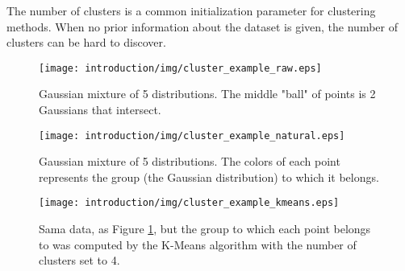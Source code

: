 The number of clusters is a common initialization parameter for clustering methods.
When no prior information about the dataset is given, the number of clusters can be hard to discover.

\begin{figure}[hbtp]
\centering
\texttt{[image: introduction/img/cluster\_example\_raw.eps]}
\caption{Gaussian mixture of 5 distributions. The middle "ball" of points is 2 Gaussians that intersect.}
\label{fig:intro raw}
\end{figure}

\begin{figure}[hbtp]
\centering
\texttt{[image: introduction/img/cluster\_example\_natural.eps]}
\caption{Gaussian mixture of 5 distributions. The colors of each point represents the group (the Gaussian distribution) to which it belongs.}
\label{fig:intro natural}
\end{figure}

\begin{figure}[hbtp]
\centering
\texttt{[image: introduction/img/cluster\_example\_kmeans.eps]}
\caption{Sama data, as Figure \ref{fig:intro raw}, but the group to which each point belongs to was computed by the K-Means algorithm with the number of clusters set to 4.}
\label{fig:intro kmeans}
\end{figure}

% 

